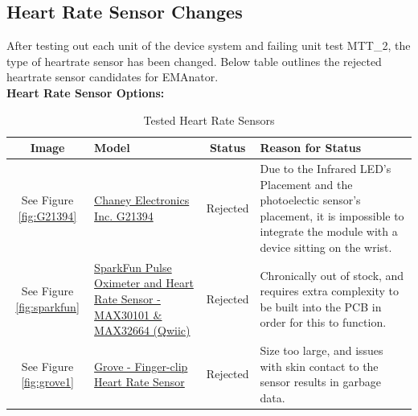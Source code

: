 \documentclass[12pt, titlepage]{article}
\begin{document}
\subsection{Heart Rate Sensor Changes}\label{hr_changes}
After testing out each unit of the device system and failing unit test MTT\_2, the type of heartrate sensor has been changed. Below table outlines the rejected heartrate sensor candidates for EMAnator.\\


\textbf{Heart Rate Sensor Options:}

\begin{table}[H]

  \label{HRSensors}\caption{Tested Heart Rate Sensors}
  \begin{tabular}{ | c | m{3cm} | c | m{7cm} |}
    \hline
    \textbf{Image}                              & \textbf{Model}                                                                                                                                                    & \textbf{Status} & \textbf{Reason for Status}                                                                                                                                                                                                                                               \\
    \hline
    See Figure \ref{fig:G21394}    & \href{https://secure.sayal.com/STORE2/View_SHOP.php?SKU=247799}{Chaney Electronics Inc. G21394}                                                                   & Rejected        & Due to the Infrared LED's Placement and the photoelectic sensor's placement, it is impossible to integrate the module with a device sitting on the wrist.                                                                                                                \\
    \hline
    See Figure \ref{fig:sparkfun}     & \href{https://www.sparkfun.com/products/15219}{SparkFun Pulse Oximeter and Heart Rate Sensor - MAX30101 \& MAX32664 (Qwiic)}                                      & Rejected        & Chronically out of stock, and requires extra complexity to be built into the PCB in order for this to function.                                                                                                                                                          \\
    \hline
    See Figure \ref{fig:grove1}      & \href{https://www.seeedstudio.com/Grove-Finger-clip-Heart-Rate-Sensor.html?queryID=ad9334e40c7058a87ffd810044eecd1c                                               & objectID=711    & indexName=bazaar_retailer_products}{Grove - Finger-clip Heart Rate Sensor}                                                                                & Rejected & Size too large, and issues with skin contact to the sensor results in garbage data.               \\

\end{tabular}
\end{table}
\end{document}
